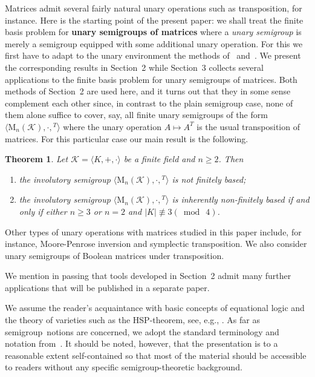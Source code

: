 \documentclass[11pt,reqno]{amsart}
\numberwithin{equation}{section}
\newtheorem{Thm}{Theorem}[section]
\theoremstyle{remark}
\def\sm{semi\-group}
\begin{document}
Matrices admit several fairly natural unary operations such as
transposition, for instance. Here is the starting point of the
present paper: we shall treat the finite basis problem for
\textbf{unary semigroups of matrices} where a \emph{unary
semigroup} is merely a semigroup equipped with some additional
unary operation. For this we first have to adapt to the unary
environment the methods of~\cite{V} and~\cite{sapirburnside}. We
present the corresponding results in Section~2 while Section~3
collects several applications to the finite basis problem for
unary semigroups of matrices. Both methods of Section~2 are used
here, and it turns out that they in some sense complement each
other since, in contrast to the plain semigroup case, none of them
alone suffice to cover, say, all finite unary semigroups of the
form $\langle\mathrm{M}_n(\mathcal{K}),\cdot,{}^T\rangle$ where
the unary operation $A\mapsto A^T$ is the usual transposition of
matrices. For this particular case our main result is the
following.
\begin{Thm}\label{main result involution}
Let $\mathcal{K}=\langle K,+,\cdot\rangle$
be a finite field and $n\ge 2$. Then
\begin{enumerate}
\item the involutory semigroup $\langle \mathrm{M}_n(\mathcal{K}),\cdot,{}^T\rangle$
is not finitely based;
\item the involutory semigroup $\langle \mathrm{M}_n(\mathcal{K}),\cdot,{}^T\rangle$
is inherently non-finitely based if and only if either $n\ge 3$ or
$n=2$ and $\vert K\vert\mathrel{\not\equiv 3} (\bmod\ 4)$.
\end{enumerate}
\end{Thm}
Other types of unary operations with matrices studied in this
paper include, for instance, Moore-Penrose inversion and
symplectic transposition. We also consider unary semigroups of
Boolean matrices under transposition.

We mention in passing that tools developed in Section~2 admit many
further applications that will be published in a separate paper.

We assume the reader's acquaintance with basic concepts of
equational logic and the theory of varieties such as the
HSP-theorem, see, e.g., \cite[Chapter~II]{BuSa81}. As far as \sm\
notions are concerned, we adopt the standard terminology and
notation from~\cite{CP}. It should be noted, however, that the
presentation is to a reasonable extent self-contained so that most
of the material  should be accessible to readers without any
specific \sm-theoretic background.
\end{document}
